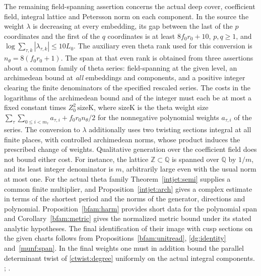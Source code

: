 The remaining field-spanning assertion concerns the actual deep
cover, coefficient field, integral lattice and Petersson norm on
each component. In the source the weight \(\lambda\) is decreasing
at every embedding, its gap between the last of the \(p\) coordinates
and the first of the \(q\) coordinates is at least \(8f_0r_0+10\),
\(p,q\ge1\), and \(\log\sum_{\tau,k}|\lambda_{\tau,k}|\le10L_0\).
The auxiliary even theta rank used for this conversion is
\(n_\theta=8(f_0r_0+1)\). The span at that even rank is obtained
from three assertions about a common family of theta series:
field-spanning at the given level, an archimedean bound at
\emph{all} embeddings and components, and a positive integer
clearing the finite denominators of the specified rescaled series.
The costs in the logarithms of the archimedean bound and of the
integer must each be at most a fixed constant times
\(Z_0^2\,\mathrm{sizeK}\), where \(\mathrm{sizeK}\) is the
theta weight size
\(\sum_{\tau}\sum_{0\le i<m_\tau}a_{\tau,i}
 +f_0r_0 n_\theta/2\) for the nonnegative polynomial weights
\(a_{\tau,i}\) of the series. The conversion to \(\lambda\) additionally
uses two twisting sections integral at all finite places, with
controlled archimedean norms, whose product induces the prescribed
change of weights. Qualitative generation over the coefficient field
does not bound either cost. For instance, the lattice
\(\mathbb Z\subset\mathbb Q\) is spanned over \(\mathbb Q\) by
\(1/m\), and its least integer denominator is \(m\), arbitrarily
large even with the usual norm at most one. For the actual theta
family Theorem~\ref{intjet:semi} supplies a common finite multiplier,
and Proposition~\ref{intjet:arch} gives a complex estimate in terms
of the shortest period and the norms of the generator, directions
and polynomial. Proposition~\ref{bfam:harm} provides short data for the polynomial span and
Corollary~\ref{bfam:metric} gives the normalized metric bound under its
stated analytic hypotheses. The final identification of their image
with cusp sections on the given charts follows from Propositions~\ref{bfam:unitread}, \ref{dg:identity} and~\ref{munf:span}. In the final weights one must in addition bound the parallel determinant twist of \eqref{ctwist:degree} uniformly on the actual integral components.
;
.


